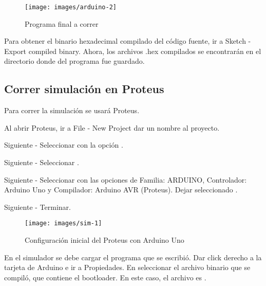 \documentclass{article}
\begin{document}
    \begin{figure}[H]
        \centering
        \texttt{[image: images/arduino-2]}
        \caption{Programa final a correr}\label{fig:figure3}
    \end{figure}

    Para obtener el binario hexadecimal compilado del código fuente, ir a
    Sketch - Export compiled binary.
    Ahora, los archivos .hex compilados se encontrarán en el directorio donde
    del programa fue guardado.

    \subsection{Correr simulación en Proteus}\label{subsec:correr-simulación
    -en-proteus}

    Para correr la simulación se usará Proteus.

    \bigbreak

    Al abrir Proteus, ir a File - New Project dar un nombre al proyecto.

    \bigbreak

    Siguiente - Seleccionar 
    con la opción .

    \bigbreak

    Siguiente - Seleccionar .

    \bigbreak

    Siguiente - Seleccionar  con las opciones
    de Familia: ARDUINO, Controlador:
    Arduino Uno y Compilador: Arduino AVR (Proteus). Dejar seleccionado
    .

    \bigbreak

    Siguiente - Terminar.

    \begin{figure}[H]
        \centering
        \texttt{[image: images/sim-1]}
        \caption{Configuración inicial del Proteus con Arduino Uno}\label{fig:figure4}
    \end{figure}

    En el simulador se debe cargar el programa que se escribió. Dar click
    derecho a la tarjeta de Arduino e ir a
    Propiedades. En  seleccionar el archivo binario
    que se compiló, que contiene el bootloader.
    En este caso, el archivo es .
\end{document}
